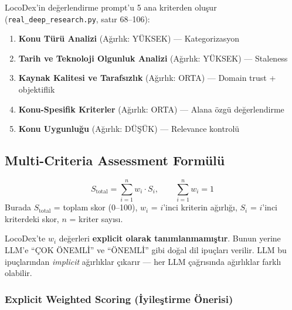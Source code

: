 LocoDex'in de\u{g}erlendirme prompt'u 5 ana kriterden olu\c{s}ur (\texttt{real\_deep\_research.py}, sat{\i}r 68--106):

\begin{enumerate}
  \item \textbf{Konu T\"{u}r\"{u} Analizi} (A\u{g}{\i}rl{\i}k: Y\"{U}KSEK) --- Kategorizasyon
  \item \textbf{Tarih ve Teknoloji Olgunluk Analizi} (A\u{g}{\i}rl{\i}k: Y\"{U}KSEK) --- Staleness
  \item \textbf{Kaynak Kalitesi ve Tarafs{\i}zl{\i}k} (A\u{g}{\i}rl{\i}k: ORTA) --- Domain trust + objektiflik
  \item \textbf{Konu-Spesifik Kriterler} (A\u{g}{\i}rl{\i}k: ORTA) --- Alana \"{o}zg\"{u} de\u{g}erlendirme
  \item \textbf{Konu Uygunlu\u{g}u} (A\u{g}{\i}rl{\i}k: D\"{U}\c{S}\"{U}K) --- Relevance kontrol\"{u}
\end{enumerate}

\subsection{Multi-Criteria Assessment Form\"{u}l\"{u}}

\begin{formulbox}
\begin{equation}
\label{eq:weighted-score}
S_{\text{total}} = \sum_{i=1}^{n} w_i \cdot S_i, \qquad \sum_{i=1}^{n} w_i = 1
\end{equation}
Burada $S_{\text{total}}$ = toplam skor (0--100), $w_i$ = $i$'inci kriterin a\u{g}{\i}rl{\i}\u{g}{\i}, $S_i$ = $i$'inci kriterdeki skor, $n$ = kriter say{\i}s{\i}.
\end{formulbox}

\begin{dikkat}
LocoDex'te $w_i$ de\u{g}erleri \textbf{explicit olarak tan{\i}mlanmam{\i}\c{s}t{\i}r}. Bunun yerine LLM'e ``\c{C}OK \"{O}NEML\.{I}'' ve ``\"{O}NEML\.{I}'' gibi do\u{g}al dil ipu\c{c}lar{\i} verilir. LLM bu ipu\c{c}lar{\i}ndan \emph{implicit} a\u{g}{\i}rl{\i}klar \c{c}{\i}kar{\i}r --- her LLM \c{c}a\u{g}r{\i}s{\i}nda a\u{g}{\i}rl{\i}klar farkl{\i} olabilir.
\end{dikkat}

\subsubsection{Explicit Weighted Scoring (\.{I}yile\c{s}tirme \"{O}nerisi)}

